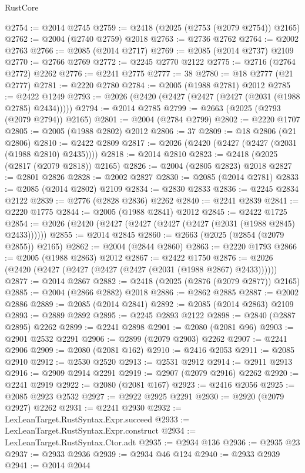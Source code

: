 \begin{lexlean}{RustCore}
\begin{coremodule}
@2754 := @2014 @2745
@2759 := @2418 (@2025 (@2753 (@2079 @2754)) @2165)
@2762 := @2004 (@2740 @2759) @2018
@2763 := @2736 @2762
@2764 := @2002 @2763
@2766 := @2085 (@2014 @2717)
@2769 := @2085 (@2014 @2737) @2109
@2770 := @2766 @2769
@2772 := @2245 @2770 @2122
@2775 := @2716 (@2764 @2772) @2262
@2776 := @2241 @2775
@2777 := 38
@2780 := @18 @2777 (@21 @2777)
@2781 := @2220 @2780
@2784 := @2005 (@1988 @2781) @2012
@2785 := @2422 @1249
@2793 := @2026 (@2420 (@2427 (@2427 (@2427 (@2031 (@1988 @2785) @2434)))))
@2794 := @2014 @2785
@2799 := @2663 (@2025 (@2793 (@2079 @2794)) @2165)
@2801 := @2004 (@2784 @2799)
@2802 := @2220 @1707
@2805 := @2005 (@1988 @2802) @2012
@2806 := 37
@2809 := @18 @2806 (@21 @2806)
@2810 := @2422 @2809
@2817 := @2026 (@2420 (@2427 (@2427 (@2031 (@1988 @2810) @2435))))
@2818 := @2014 @2810
@2823 := @2418 (@2025 (@2817 (@2079 @2818)) @2165)
@2826 := @2004 (@2805 @2823) @2018
@2827 := @2801 @2826
@2828 := @2002 @2827
@2830 := @2085 (@2014 @2781)
@2833 := @2085 (@2014 @2802) @2109
@2834 := @2830 @2833
@2836 := @2245 @2834 @2122
@2839 := @2776 (@2828 @2836) @2262
@2840 := @2241 @2839
@2841 := @2220 @1775
@2844 := @2005 (@1988 @2841) @2012
@2845 := @2422 @1725
@2854 := @2026 (@2420 (@2427 (@2427 (@2427 (@2427 (@2031 (@1988 @2845) @2433))))))
@2855 := @2014 @2845
@2860 := @2663 (@2025 (@2854 (@2079 @2855)) @2165)
@2862 := @2004 (@2844 @2860)
@2863 := @2220 @1793
@2866 := @2005 (@1988 @2863) @2012
@2867 := @2422 @1750
@2876 := @2026 (@2420 (@2427 (@2427 (@2427 (@2427 (@2031 (@1988 @2867) @2433))))))
@2877 := @2014 @2867
@2882 := @2418 (@2025 (@2876 (@2079 @2877)) @2165)
@2885 := @2004 (@2866 @2882) @2018
@2886 := @2862 @2885
@2887 := @2002 @2886
@2889 := @2085 (@2014 @2841)
@2892 := @2085 (@2014 @2863) @2109
@2893 := @2889 @2892
@2895 := @2245 @2893 @2122
@2898 := @2840 (@2887 @2895) @2262
@2899 := @2241 @2898
@2901 := @2080 (@2081 @96)
@2903 := @2901 @2532 @2291
@2906 := @2899 (@2079 @2903) @2262
@2907 := @2241 @2906
@2909 := @2080 (@2081 @162)
@2910 := @2416 @2053
@2911 := @2085 @2910
@2912 := @2530 @2520
@2913 := @2531 @2912
@2914 := @2911 @2913
@2916 := @2909 @2914 @2291
@2919 := @2907 (@2079 @2916) @2262
@2920 := @2241 @2919
@2922 := @2080 (@2081 @167)
@2923 := @2416 @2056
@2925 := @2085 @2923 @2532
@2927 := @2922 @2925 @2291
@2930 := @2920 (@2079 @2927) @2262
@2931 := @2241 @2930
@2932 := LexLeanTarget.RustSyntax.Expr.succeed
@2933 := LexLeanTarget.RustSyntax.Expr.construct
@2934 := LexLeanTarget.RustSyntax.Ctor.adt
@2935 := @2934 @136
@2936 := @2935 @23
@2937 := @2933 @2936
@2939 := @2934 @46 @124
@2940 := @2933 @2939
@2941 := @2014 @2044

\end{coremodule}
\end{lexlean}
